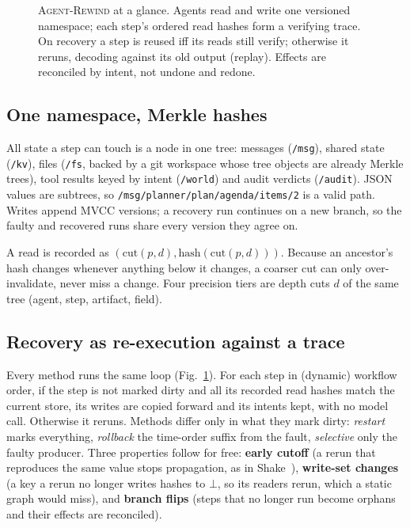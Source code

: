 \documentclass[10pt,twocolumn,letterpaper]{article}
\newcommand{\sys}{\textsc{Agent-Rewind}}
\begin{document}
\begin{figure}[t]
\caption{\sys{} at a glance. Agents read and write one versioned namespace; each
step's ordered read hashes form a verifying trace. On recovery a step is reused
iff its reads still verify; otherwise it reruns, decoding against its old output
(replay). Effects are reconciled by intent, not undone and redone.}
\label{fig:arch}
\end{figure}

\subsection{One namespace, Merkle hashes}
All state a step can touch is a node in one tree: messages (\texttt{/msg}), shared
state (\texttt{/kv}), files (\texttt{/fs}, backed by a git workspace whose tree
objects are already Merkle trees), tool results keyed by intent (\texttt{/world})
and audit verdicts (\texttt{/audit}). JSON values are subtrees, so
\texttt{/msg/planner/plan/agenda/items/2} is a valid path. Writes append MVCC
versions; a recovery run continues on a new branch, so the faulty and recovered
runs share every version they agree on.

A read is recorded as $(\mathrm{cut}(p,d), \mathrm{hash}(\mathrm{cut}(p,d)))$.
Because an ancestor's hash changes whenever anything below it changes, a coarser
cut can only over-invalidate, never miss a change. Four precision tiers are depth
cuts $d$ of the same tree (agent, step, artifact, field).

\subsection{Recovery as re-execution against a trace}
Every method runs the same loop (Fig.~\ref{fig:arch}). For each step in (dynamic)
workflow order, if the step is not marked dirty and all its recorded read hashes
match the current store, its writes are copied forward and its intents kept, with
no model call. Otherwise it reruns. Methods differ only in what they mark dirty:
\emph{restart} marks everything, \emph{rollback} the time-order suffix from the
fault, \emph{selective} only the faulty producer. Three properties follow for free: \textbf{early cutoff} (a rerun that reproduces
the same value stops propagation, as in Shake~\cite{mitchell2012shake}),
\textbf{write-set changes} (a key a rerun no longer writes hashes to $\bot$, so its
readers rerun, which a static graph would miss), and \textbf{branch flips} (steps
that no longer run become orphans and their effects are reconciled).
\end{document}
